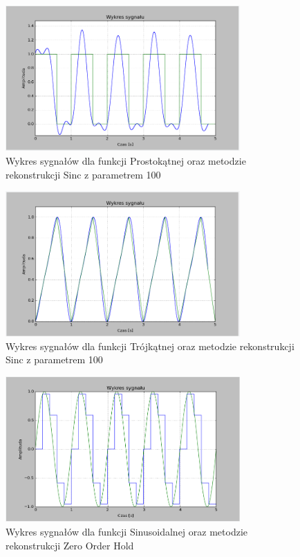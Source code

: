 \documentclass{article}
\begin{document}
    \begin{figure}[h!]
        \centering
        \includegraphics[width=0.8\textwidth]{img/1/sinc_rec.png}
        \caption{Wykres sygnałów dla funkcji Prostokątnej oraz metodzie rekonstrukcji Sinc z parametrem 100}
    \end{figure}
    \FloatBarrier

    \begin{figure}[h!]
        \centering
        \includegraphics[width=0.8\textwidth]{img/1/sinc_tri.png}
        \caption{Wykres sygnałów dla funkcji Trójkątnej oraz metodzie rekonstrukcji Sinc z parametrem 100}
    \end{figure}
    \FloatBarrier

    \begin{figure}[h!]
        \centering
        \includegraphics[width=0.8\textwidth]{img/1/zoh5.png}
        \caption{Wykres sygnałów dla funkcji Sinusoidalnej oraz metodzie rekonstrukcji Zero Order Hold}
    \end{figure}
    \FloatBarrier
\end{document}
